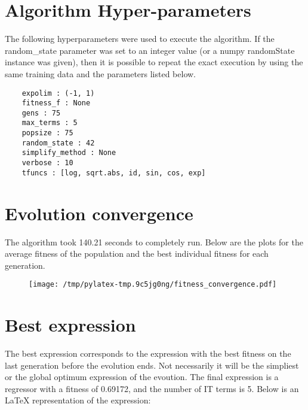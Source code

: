 \documentclass{article}%
\begin{document}
%
\vfill \pagebreak

%
\section*{Algorithm Hyper-parameters}%
\label{sec:AlgorithmHyper{-}parameters}%

                The following hyperparameters were used to execute the
                algorithm. If the random\_state parameter was set to an 
                integer value (or a numpy randomState instance was given), then
                it is possible to repeat the exact execution by using the same
                training data and the parameters listed below.%
{\footnotesize \begin{verbatim}    expolim : (-1, 1)
    fitness_f : None
    gens : 75
    max_terms : 5
    popsize : 75
    random_state : 42
    simplify_method : None
    verbose : 10
    tfuncs : [log, sqrt.abs, id, sin, cos, exp]\end{verbatim} } \vfill \pagebreak

%

            \chead{}
            \rhead{\today, \currenttime}
            
            \lfoot{}
            \cfoot{}
            \rfoot{\thepage\ | \pageref{LastPage}}
\section*{Evolution convergence}%
\label{sec:Evolutionconvergence}%

                The algorithm took 140.21 seconds to
                completely run. Below are the plots for the average fitness
                of the population and the best individual fitness for each
                generation.\vfill%


\begin{figure}[H]%
\centering%
\texttt{[image: /tmp/pylatex-tmp.9c5jg0ng/fitness\_convergence.pdf]}%
\end{figure}

%
\vfill \pagebreak

%
\section*{Best expression}%
\label{sec:Bestexpression}%

                The best expression corresponds to the expression with
                the best fitness on the last generation before the evolution
                ends. Not necessarily it will be the simpliest or the global
                optimum expression of the evoution. The final expression is a regressor with a fitness of
                0.69172, and the number of IT terms is
                5. Below is an LaTeX representation
                of the expression:
                
\end{document}
